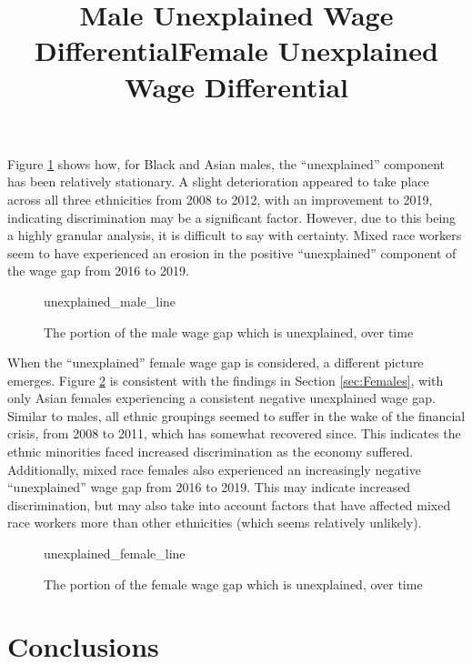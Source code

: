 \documentclass[class=article, crop=false]{standalone}
\begin{document}
Figure \ref{fig:unexplained_male_line} shows how, for Black and Asian males, the \enquote{unexplained} component has been relatively stationary. A slight deterioration appeared to take place across all three ethnicities from 2008 to 2012, with an improvement to 2019, indicating discrimination may be a significant factor. However, due to this being a highly granular analysis, it is difficult to say with certainty. Mixed race workers seem to have experienced an erosion in the positive \enquote{unexplained} component of the wage gap from 2016 to 2019.

\begin{figure}[h]
\centering
    \title{Male Unexplained Wage Differential}
    {unexplained_male_line}
    \caption{The portion of the male wage gap which is unexplained, over time}
    \label{fig:unexplained_male_line}
\end{figure}

When the \enquote{unexplained} female wage gap is considered, a different picture emerges. Figure \ref{fig:unexplained_female_line} is consistent with the findings in Section \ref{sec:Females}, with only Asian females experiencing a consistent negative unexplained wage gap. Similar to males, all ethnic groupings seemed to suffer in the wake of the financial crisis, from 2008 to 2011, which has somewhat recovered since. This indicates the ethnic minorities faced increased discrimination as the economy suffered. Additionally, mixed race females also experienced an increasingly negative \enquote{unexplained} wage gap from 2016 to 2019. This may indicate increased discrimination, but may also take into account factors that have affected mixed race workers more than other ethnicities (which seems relatively unlikely).

\begin{figure}[h]
\centering
    \title{Female Unexplained Wage Differential}
    {unexplained_female_line}
    \caption{The portion of the female wage gap which is unexplained, over time}
    \label{fig:unexplained_female_line}
\end{figure}

\section{Conclusions}
\label{sec:conclusions}
\end{document}
